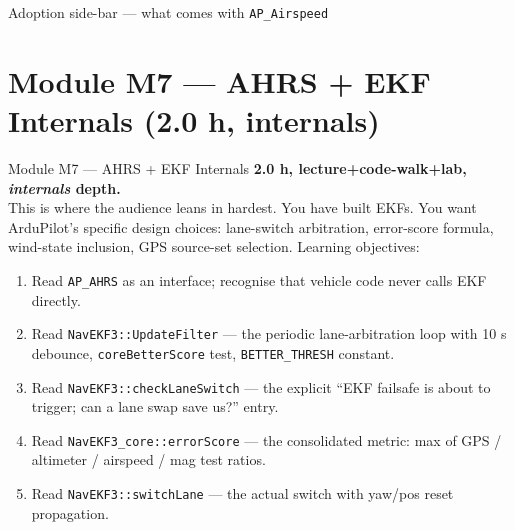 \documentclass[aspectratio=169,11pt]{beamer}
\begin{document}
\begin{frame}[allowframebreaks]{Adoption side-bar --- what comes with \texttt{AP\_Airspeed}}
\end{frame}

\section{Module M7 --- AHRS + EKF Internals (2.0 h, internals)}

\begin{frame}{Module M7 --- AHRS + EKF Internals}
  \textbf{2.0 h, lecture+code-walk+lab, \emph{internals} depth.}\\[1ex]
  This is where the audience leans in hardest. You have built EKFs. You want ArduPilot's specific design choices: lane-switch arbitration, error-score formula, wind-state inclusion, GPS source-set selection.
  \vfill
  Learning objectives:
  \begin{enumerate}
    \item Read \texttt{AP\_AHRS} as an interface; recognise that vehicle code never calls EKF directly.
    \item Read \texttt{NavEKF3::UpdateFilter} --- the periodic lane-arbitration loop with 10 s debounce, \texttt{coreBetterScore} test, \texttt{BETTER\_THRESH} constant.
    \item Read \texttt{NavEKF3::checkLaneSwitch} --- the explicit ``EKF failsafe is about to trigger; can a lane swap save us?'' entry.
    \item Read \texttt{NavEKF3\_core::errorScore} --- the consolidated metric: max of GPS / altimeter / airspeed / mag test ratios.
    \item Read \texttt{NavEKF3::switchLane} --- the actual switch with yaw/pos reset propagation.
  \end{enumerate}
\end{frame}
\end{document}
